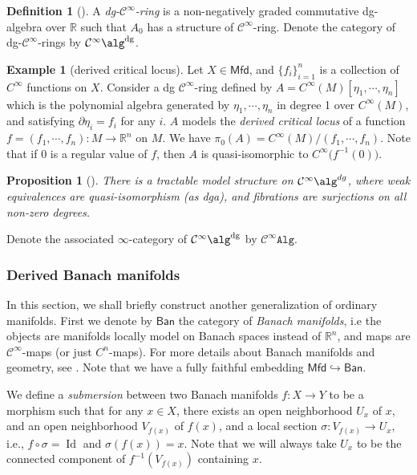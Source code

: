 \documentclass[12pt]{amsart}
\newtheorem{prop}[thm]{Proposition}
\theoremstyle{definition}
\newtheorem{example}[thm]{Example}
\newtheorem{defn}[thm]{Definition}
\theoremstyle{remark}
\numberwithin{equation}{section}
\newcommand{\del}{\partial}
\renewcommand{\del}{\partial}
\newcommand{\cinf}{{\mathcal C}^{\infty}}
\newcommand{\R}{{\mathbb{R}}}
\newcommand{\1}{{\mathbb{1}}}
\newcommand{\ban}{\mathsf{Ban}}
\newcommand{\mfd}{\mathsf{Mfd}}
\newcommand{\algi}{\mathtt{Alg}}
\newcommand{\dg}{{\operatorname{dg}}}
\newcommand{\id}{\operatorname{Id}}
\begin{document}
\begin{defn}[\cite{CR12}]
	A {\it dg-$\cinf$-ring}\index{dg-$\cinf$-ring} is a non-negatively graded commutative dg-algebra over $\R$ such that $A_0$ has a structure of $\cinf$-ring. Denote the category of dg-$\cinf$-rings by $\cinf\alg^{\dg}$.
\end{defn}
\begin{example}[derived critical locus]
	Let $X\in\mfd$, and $\{f_i\}_{i=1}^n$ is a collection of $C^{\infty}$ functions on $X$. Consider a dg $\cinf$-ring defined by $A=C^{\infty}(M)[\eta_1,\cdots, \eta_n]$ which is the polynomial algebra generated by $\eta_1,\cdots, \eta_n$ in degree 1 over $ C^{\infty}(M)$, and satisfying $\del \eta_i =f_i$ for any $i$. $A$ models the {\it derived critical locus} of a function $f=(f_1,\cdots,f_n): M\to \R^n$ on $M$. We have $\pi_0(A)=C^{\infty}(M)/(f_1,\cdots,f_n)$. Note that if $0$ is a regular value of $f$, then $A$ is quasi-isomorphic to $C^{\infty}\big(f^{-1}(0) \big)$. 
\end{example}

\begin{prop}[\cite{CR12}]
There is a tractable model structure on $\cinf\alg^{dg}$, where weak equivalences are quasi-isomorphism (as dga), and fibrations are surjections on all non-zero degrees. 
\end{prop}
Denote the associated $\infty$-category of $\cinf\alg^{\dg}$ by $\cinf\algi$.


\subsubsection{Derived Banach manifolds}
In this section, we shall briefly construct another generalization of ordinary manifolds. First we denote by $\ban$ the category of {\it Banach manifolds}, i.e the objects are manifolds locally model on Banach spaces instead of $\R^n$, and maps are $\cinf$-maps (or just $C^n$-maps). For more details about Banach manifolds and geometry, see \cite{Lan95}. Note that we have a fully faithful embedding $\mfd \hookrightarrow \ban$.

We define a {\it submersion} between two Banach manifolds $f:X\to Y$ to be a morphism such that for any $x\in X$, there exists an open neighborhood $U_x$ of $x$, and an open neighborhood $V_{f(x)}$ of $f(x)$, and a local section $\sigma: V_{f(x)} \to U_x$, i.e., $f\circ \sigma = \id$ and $\sigma(f(x)) = x$. Note that we will always take $U_x$ to be the connected component of $f^{-1}(V_{f(x)})$ containing $x$.
\end{document}
